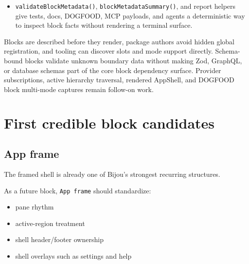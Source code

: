 \begin{itemize}
\item
  \texttt{v\allowbreak{}a\allowbreak{}l\allowbreak{}i\allowbreak{}d\allowbreak{}a\allowbreak{}t\allowbreak{}e\allowbreak{}B\allowbreak{}l\allowbreak{}o\allowbreak{}c\allowbreak{}k\allowbreak{}M\allowbreak{}e\allowbreak{}t\allowbreak{}a\allowbreak{}d\allowbreak{}a\allowbreak{}t\allowbreak{}a\allowbreak{}(\allowbreak{})}, \texttt{b\allowbreak{}l\allowbreak{}o\allowbreak{}c\allowbreak{}k\allowbreak{}M\allowbreak{}e\allowbreak{}t\allowbreak{}a\allowbreak{}d\allowbreak{}a\allowbreak{}t\allowbreak{}a\allowbreak{}S\allowbreak{}u\allowbreak{}m\allowbreak{}m\allowbreak{}a\allowbreak{}r\allowbreak{}y\allowbreak{}(\allowbreak{})}, and report helpers give tests, docs, DOGFOOD, MCP payloads, and agents a deterministic way to inspect block facts without rendering a terminal surface.
\end{itemize}

Blocks are described before they render, package authors avoid hidden global registration, and tooling can discover slots and mode support directly. Schema-bound blocks validate unknown boundary data without making Zod, GraphQL, or database schemas part of the core block dependency surface. Provider subscriptions, active hierarchy traversal, rendered AppShell, and DOGFOOD block multi-mode captures remain follow-on work.

\section{First credible block candidates}\label{record-018-first-credible-block-candidates}

\subsection{App frame}\label{record-018-app-frame}

The framed shell is already one of Bijou's strongest recurring structures.

As a future block, \texttt{A\allowbreak{}p\allowbreak{}p\allowbreak{} \allowbreak{}f\allowbreak{}r\allowbreak{}a\allowbreak{}m\allowbreak{}e} should standardize:

\begin{itemize}
\tightlist
\item
  pane rhythm
\item
  active-region treatment
\item
  shell header/footer ownership
\item
  shell overlays such as settings and help
\end{itemize}


